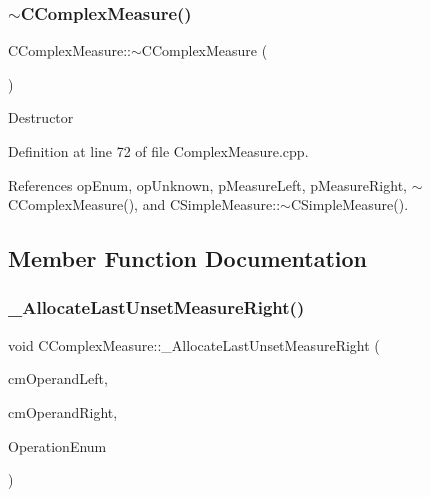 \subsubsection{\texorpdfstring{$\sim$\+C\+Complex\+Measure()}{~CComplexMeasure()}}
{\footnotesize\ttfamily C\+Complex\+Measure\+::$\sim$\+C\+Complex\+Measure (\begin{DoxyParamCaption}{ }\end{DoxyParamCaption})}

Destructor 

Definition at line 72 of file Complex\+Measure.\+cpp.



References op\+Enum, op\+Unknown, p\+Measure\+Left, p\+Measure\+Right, $\sim$\+C\+Complex\+Measure(), and C\+Simple\+Measure\+::$\sim$\+C\+Simple\+Measure().



\subsection{Member Function Documentation}
\mbox{\label{classCComplexMeasure_aee812c93b8b2fe3839e9a38df63cfd53}} 
\subsubsection{\texorpdfstring{\+\_\+\+Allocate\+Last\+Unset\+Measure\+Right()}{\_AllocateLastUnsetMeasureRight()}}
{\footnotesize\ttfamily void C\+Complex\+Measure\+::\+\_\+\+Allocate\+Last\+Unset\+Measure\+Right (\begin{DoxyParamCaption}\item[{\hyperlink{classCComplexMeasure}{C\+Complex\+Measure} \&}]{cm\+Operand\+Left,  }\item[{const \hyperlink{classCComplexMeasure}{C\+Complex\+Measure} \&}]{cm\+Operand\+Right,  }\item[{const \hyperlink{MeasureOperator_8h_a1431c79e3ad4b4c5bcc9f31f188538f2}{e\+Operation}}]{Operation\+Enum }\end{DoxyParamCaption})\hspace{0.3cm}{\ttfamily [protected]}}



